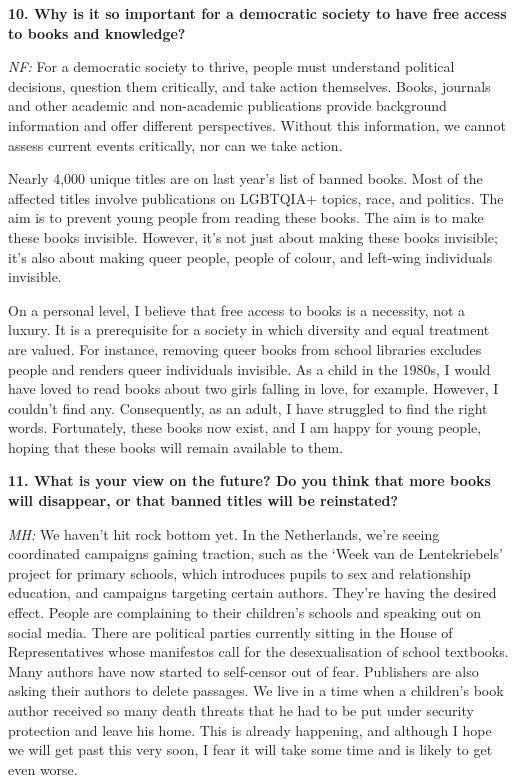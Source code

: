 \documentclass[a4paper,
fontsize=11pt,
oneside,
numbers=noperiodatend,
parskip=half-,
bibliography=totoc,
final
]{scrartcl}
\begin{document}
\textbf{10. Why is it so important for a democratic society to have free
access to books and knowledge?}

\emph{NF:} For a democratic society to thrive, people must understand
political decisions, question them critically, and take action
themselves. Books, journals and other academic and non-acade\-mic
publications provide background information and offer different
perspectives. Without this information, we cannot assess current events
critically, nor can we take action.

Nearly 4,000 unique titles are on last year's list of
banned books. Most of the affected titles involve publications on
LGBTQIA+ topics, race, and politics. The aim is to prevent young people
from reading these books. The aim is to make these books invisible.
However, it's not just about making these books
invisible; it's also about making queer people, people
of colour, and left-wing individuals invisible.

On a personal level, I believe that free access to books is a necessity,
not a luxury. It is a prerequisite for a society in which diversity and
equal treatment are valued. For instance, removing queer books from
school libraries excludes people and renders queer individuals
invisible. As a child in the 1980s, I would have loved to read books
about two girls falling in love, for example. However, I couldn't find
any. Consequently, as an adult, I have struggled to find the right
words. Fortunately, these books now exist, and I am happy for young
people, hoping that these books will remain available to them.

\textbf{11. What is your view on the future? Do you think that more
books will disappear, or that banned titles will be reinstated?}

\emph{MH:} We haven't hit rock bottom yet. In the Netherlands, we're
seeing coordinated campaigns gaining traction, such as the
\enquote*{Week van de Lentekriebels} project for primary schools, which
introduces pupils to sex and relationship education, and campaigns
targeting certain authors. They're having the desired effect. People are
complaining to their children's schools and speaking out on social
media. There are political parties currently sitting in the House of
Representatives whose manifestos call for the desexualisation of school
textbooks. Many authors have now started to self-censor out of fear.
Publishers are also asking their authors to delete passages. We live in
a time when a children's book author received so many death threats that
he had to be put under security protection and leave his home. This is
already happening, and although I hope we will get past this very soon,
I fear it will take some time and is likely to get even worse.
\end{document}

